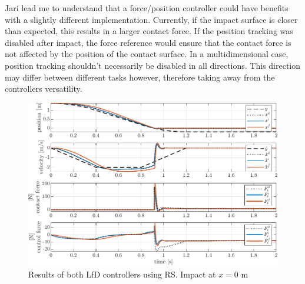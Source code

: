\documentclass[11pt]{report}
\numberwithin{equation}{section}        %
\numberwithin{figure}{section}          %
\numberwithin{table}{section}           %
\begin{document}
  Jari lead me to understand that a force/position controller could have benefits with a slightly different implementation. Currently, if the impact surface is closer than expected, this results in a larger contact force. If the position tracking was disabled after impact, the force reference would ensure that the contact force is not affected by the position of the contact surface. In a multidimensional case, position tracking shouldn't necessarily be disabled in all directions. This direction may differ between different tasks however, therefore taking away from the controllers versatility.


  \begin{figure}[!h]
  \centering
  \begin{adjustwidth}{0pt}{5pt}
  \includegraphics[right]{Graphics/1d_learned_w=0.pdf}
  \end{adjustwidth}
  \caption{Results of both LfD controllers using RS. Impact at $x=0$ m}
  \label{fig:1d_learned_w0}
  \end{figure}
\end{document}
